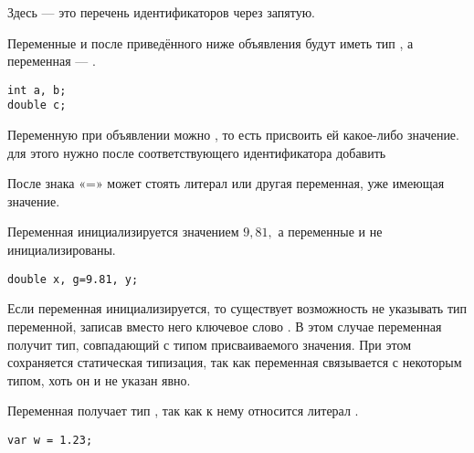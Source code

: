 \begin{center}
  \Lst{ }\Lst{;}
\par\end{center}

Здесь  — это перечень
идентификаторов через запятую.

\begin{example}
  Переменные  и  после приведённого ниже
  объявления будут иметь тип , а переменная  —
  .
\begin{lstlisting}
int a, b;
double c;
\end{lstlisting}
\end{example}


Переменную при объявлении можно
, то есть присвоить ей
какое-либо значение. для этого нужно после соответствующего
идентификатора добавить

\begin{center}
  \Lst{= }
\par\end{center}

После знака «=» может стоять литерал или другая переменная, уже имеющая
значение.

\begin{example}
  Переменная  инициализируется значением $9{,}81,$ а
  переменные  и  не инициализированы.

\begin{lstlisting}
double x, g=9.81, y;
\end{lstlisting}
\end{example}

Если переменная инициализируется, то существует возможность не
указывать тип переменной, записав вместо него ключевое слово
. В этом случае переменная получит тип, совпадающий с
типом присваиваемого значения. При этом сохраняется статическая
типизация, так как переменная связывается с некоторым типом, хоть он и
не указан явно.

\begin{example}
Переменная  получает тип , так как к нему
относится литерал .

\begin{lstlisting}
var w = 1.23;
\end{lstlisting}
\end{example}

